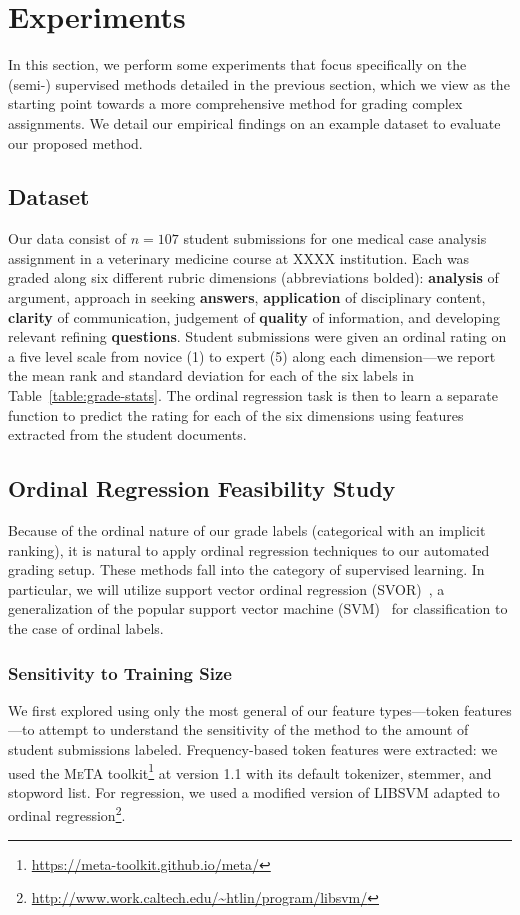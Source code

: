 \section{Experiments}

In this section, we perform some experiments that focus specifically on the
(semi-) supervised methods detailed in the previous section, which we view
as the starting point towards a more comprehensive method for grading
complex assignments. We detail our empirical findings on an example
dataset to evaluate our proposed method.

\subsection{Dataset}

Our data consist of $n = 107$ student submissions for one medical case
analysis assignment in a veterinary medicine course at XXXX institution.
Each was graded along six different rubric dimensions (abbreviations
bolded): \textbf{analysis} of argument, approach in seeking
\textbf{answers}, \textbf{application} of disciplinary content,
\textbf{clarity} of communication, judgement of \textbf{quality} of
information, and developing relevant refining \textbf{questions}. Student
submissions were given an ordinal rating on a five level scale from novice
(1) to expert (5) along each dimension---we report the mean rank and
standard deviation for each of the six labels in
Table~\ref{table:grade-stats}. The ordinal regression task is then to
learn a separate function to predict the rating for each of the six
dimensions using features extracted from the student documents.



\subsection{Ordinal Regression Feasibility Study}

Because of the ordinal nature of our grade labels (categorical with an
implicit ranking), it is natural to apply ordinal regression techniques to
our automated grading setup. These methods fall into the category of
supervised learning. In particular, we will utilize support vector
ordinal regression (SVOR)~\cite{Chu:2007:SVOR}, a generalization of the
popular support vector machine (SVM)~\cite{Cortes:1995:SVM} for
classification to the case of ordinal labels.

\subsubsection{Sensitivity to Training Size}
We first explored using only the most general of our feature types---token
features---to attempt to understand the sensitivity of the method to the
amount of student submissions labeled. Frequency-based token features were
extracted: we used the \textsc{MeTA}
toolkit\footnote{\url{https://meta-toolkit.github.io/meta/}} at version 1.1
with its default tokenizer, stemmer, and stopword list. For regression, we
used a modified version of \textsc{LIBSVM} adapted to ordinal
regression\footnote{\url{http://www.work.caltech.edu/~htlin/program/libsvm/}}.

